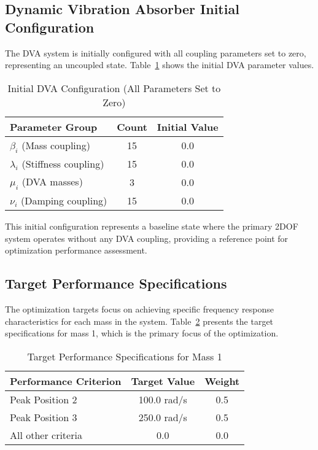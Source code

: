 \documentclass[12pt,a4paper]{article}
\begin{document}
\subsection{Dynamic Vibration Absorber Initial Configuration}

The DVA system is initially configured with all coupling parameters set to zero, representing an uncoupled state. Table~\ref{Tab:dva_initial_config} shows the initial DVA parameter values.

\begin{table}[h!]
\centering
\caption{Initial DVA Configuration (All Parameters Set to Zero)}
\label{Tab:dva_initial_config}
\begin{tabular}{lcc}
\toprule
\textbf{Parameter Group} & \textbf{Count} & \textbf{Initial Value} \\
\midrule
$\beta_i$ (Mass coupling) & 15 & 0.0 \\
$\lambda_i$ (Stiffness coupling) & 15 & 0.0 \\
$\mu_i$ (DVA masses) & 3 & 0.0 \\
$\nu_i$ (Damping coupling) & 15 & 0.0 \\
\bottomrule
\end{tabular}
\end{table}

This initial configuration represents a baseline state where the primary 2DOF system operates without any DVA coupling, providing a reference point for optimization performance assessment.

\subsection{Target Performance Specifications}

The optimization targets focus on achieving specific frequency response characteristics for each mass in the system. Table~\ref{Tab:target_specifications} presents the target specifications for mass 1, which is the primary focus of the optimization.

\begin{table}[h!]
\centering
\caption{Target Performance Specifications for Mass 1}
\label{Tab:target_specifications}
\begin{tabular}{lcc}
\toprule
\textbf{Performance Criterion} & \textbf{Target Value} & \textbf{Weight} \\
\midrule
Peak Position 2 & 100.0 rad/s & 0.5 \\
Peak Position 3 & 250.0 rad/s & 0.5 \\
All other criteria & 0.0 & 0.0 \\
\bottomrule
\end{tabular}
\end{table}
\end{document}

